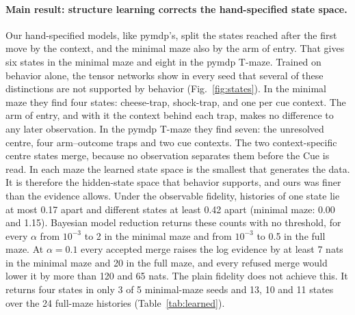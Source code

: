 \documentclass[letterpaper]{article} %
\theoremstyle{definition}
\begin{document}
\paragraph{Main result: structure learning corrects the hand-specified state space.} Our hand-specified models, like pymdp's, split the states reached after the first move by the context, and the minimal maze also by the arm of entry. That gives six states in the minimal maze and eight in the pymdp T-maze. Trained on behavior alone, the tensor networks show in every seed that several of these distinctions are not supported by behavior (Fig.~\ref{fig:states}). In the minimal maze they find four states: cheese-trap, shock-trap, and one per cue context. The arm of entry, and with it the context behind each trap, makes no difference to any later observation. In the pymdp T-maze they find seven: the unresolved centre, four arm--outcome traps and two cue contexts. The two context-specific centre states merge, because no observation separates them before the Cue is read. In each maze the learned state space is the smallest that generates the data. It is therefore the hidden-state space that behavior supports, and ours was finer than the evidence allows. Under the observable fidelity, histories of one state lie at most 0.17 apart and different states at least 0.42 apart (minimal maze: 0.00 and 1.15). Bayesian model reduction returns these counts with no threshold, for every $\alpha$ from $10^{-3}$ to 2 in the minimal maze and from $10^{-3}$ to 0.5 in the full maze. At $\alpha = 0.1$ every accepted merge raises the log evidence by at least 7 nats in the minimal maze and 20 in the full maze, and every refused merge would lower it by more than 120 and 65 nats. The plain fidelity does not achieve this. It returns four states in only 3 of 5 minimal-maze seeds and 13, 10 and 11 states over the 24 full-maze histories (Table~\ref{tab:learned}).
\end{document}
